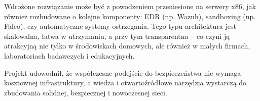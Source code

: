 \documentclass[
    left=2.5cm,         %
    right=2.5cm,        %
    top=2.5cm,          %
    bottom=3cm,         %
    bindingoffset=6mm,  %
    nohyphenation=true %
]{eiti/eiti-thesis} %
\begin{document}
Wdrożone rozwiązanie może być z powodzeniem przeniesione na serwery x86, jak również rozbudowane o kolejne komponenty: EDR (np. Wazuh\cite{wazuh_agent}), sandboxing (np. Falco\cite{falco_docs}), czy automatyczne systemy ostrzegania. Tego typu architektura jest skalowalna, łatwa w utrzymaniu, a przy tym transparentna – co czyni ją atrakcyjną nie tylko w środowiskach domowych, ale również w małych firmach, laboratoriach badawczych i edukacyjnych.

Projekt udowodnił, że współczesne podejście do bezpieczeństwa nie wymaga kosztownej infrastruktury, a wiedza i otwartoźródłowe narzędzia wystarczą do zbudowania solidnej, bezpiecznej i nowoczesnej sieci.


\newpage

\end{document}
